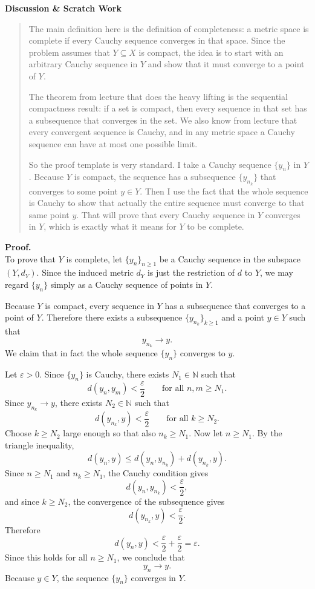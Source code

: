 \documentclass[12pt]{article}
\newenvironment{scratch}{%
  \par\smallskip
  \noindent\textbf{Discussion \& Scratch Work}\begin{quote}\small
}{%
  \end{quote}\smallskip
}
\begin{document}
\begin{scratch}
The main definition here is the definition of completeness: a metric space is complete if every Cauchy sequence converges in that space. Since the problem assumes that $Y\subseteq X$ is compact, the idea is to start with an arbitrary Cauchy sequence in $Y$ and show that it must converge to a point of $Y$.

The theorem from lecture that does the heavy lifting is the sequential compactness result: if a set is compact, then every sequence in that set has a subsequence that converges in the set. We also know from lecture that every convergent sequence is Cauchy, and in any metric space a Cauchy sequence can have at most one possible limit.

So the proof template is very standard. I take a Cauchy sequence $\{y_n\}$ in $Y$. Because $Y$ is compact, the sequence has a subsequence $\{y_{n_k}\}$ that converges to some point $y\in Y$. Then I use the fact that the whole sequence is Cauchy to show that actually the entire sequence must converge to that same point $y$. That will prove that every Cauchy sequence in $Y$ converges in $Y$, which is exactly what it means for $Y$ to be complete.
\end{scratch}

\textbf{Proof.}\\
To prove that $Y$ is complete, let $\{y_n\}_{n\ge 1}$ be a Cauchy sequence in the subspace $(Y,d_Y)$. Since the induced metric $d_Y$ is just the restriction of $d$ to $Y$, we may regard $\{y_n\}$ simply as a Cauchy sequence of points in $Y$.

Because $Y$ is compact, every sequence in $Y$ has a subsequence that converges to a point of $Y$. Therefore there exists a subsequence $\{y_{n_k}\}_{k\ge 1}$ and a point $y\in Y$ such that
\[
y_{n_k}\to y.
\]
We claim that in fact the whole sequence $\{y_n\}$ converges to $y$.

Let $\varepsilon>0$. Since $\{y_n\}$ is Cauchy, there exists $N_1\in\mathbb{N}$ such that
\[
d(y_n,y_m)<\frac{\varepsilon}{2}
\qquad \text{for all } n,m\ge N_1.
\]
Since $y_{n_k}\to y$, there exists $N_2\in\mathbb{N}$ such that
\[
d(y_{n_k},y)<\frac{\varepsilon}{2}
\qquad \text{for all } k\ge N_2.
\]
Choose $k\ge N_2$ large enough so that also $n_k\ge N_1$. Now let $n\ge N_1$. By the triangle inequality,
\[
d(y_n,y)
\le d(y_n,y_{n_k})+d(y_{n_k},y).
\]
Since $n\ge N_1$ and $n_k\ge N_1$, the Cauchy condition gives
\[
d(y_n,y_{n_k})<\frac{\varepsilon}{2},
\]
and since $k\ge N_2$, the convergence of the subsequence gives
\[
d(y_{n_k},y)<\frac{\varepsilon}{2}.
\]
Therefore
\[
d(y_n,y)<\frac{\varepsilon}{2}+\frac{\varepsilon}{2}=\varepsilon.
\]
Since this holds for all $n\ge N_1$, we conclude that
\[
y_n\to y.
\]
Because $y\in Y$, the sequence $\{y_n\}$ converges in $Y$.
\end{document}
